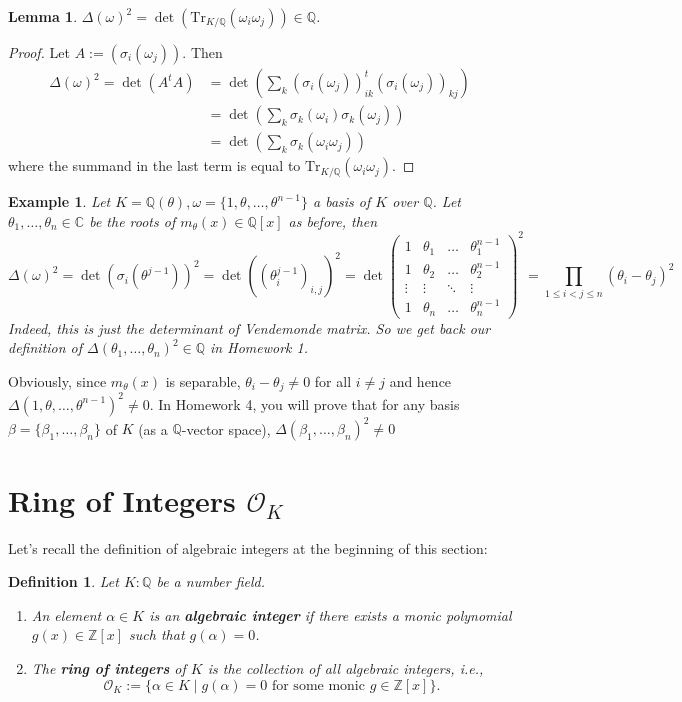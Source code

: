 \documentclass[11pt]{book}
\newtheorem{definition}[theorem]{Definition}
\newtheorem{example}[theorem]{Example}
\newtheorem{lemma}[theorem]{Lemma}
\begin{document}
\begin{lemma} $\Delta(\omega)^2 = \det(\text{Tr}_{K/\mathbb{Q}}(\omega_i\omega_j)) \in \mathbb{Q}$.
\end{lemma}

\begin{proof} Let $A := (\sigma_i(\omega_j))$. Then
\begin{align*}
\Delta(\omega)^2 = \det(A^t A) &= \det\left(\sum_k (\sigma_i(\omega_j))^t_{ik}(\sigma_i(\omega_j))_{kj}\right)
\\ &= \det\left(\sum_k \sigma_k(\omega_i)\sigma_k(\omega_j)\right)\\
&= \det\left(\sum_k \sigma_k(\omega_i\omega_j)\right)
\end{align*}
where the summand in the last term is equal to $\text{Tr}_{K/\mathbb{Q}}(\omega_i\omega_j)$.
\end{proof}

\begin{example} \label{eg-discrim} Let $K = \mathbb{Q}(\theta), \omega = \{1, \theta, \dots, \theta^{n-1}\}$ a basis of $K$ over $\mathbb{Q}$. Let $\theta_1, \dots, \theta_n \in \mathbb{C}$ be the roots of $m_{\theta}(x) \in \mathbb{Q}[x]$ as before, then
\[
\Delta(\omega)^2 = \det(\sigma_i(\theta^{j-1}))^2 = \det((\theta_i^{j-1})_{i,j})^2
= \det\begin{pmatrix}
1 & \theta_1 & \dots & \theta_1^{n-1} \\
1 & \theta_2 & \dots & \theta_2^{n-1} \\
\vdots & \vdots & \ddots & \vdots \\
1 & \theta_n & \dots & \theta_n^{n-1}
\end{pmatrix}^2 = \prod_{1\leq i<j \leq n} (\theta_i - \theta_j)^2
\]
Indeed, this is just the determinant of Vendemonde matrix. So we get back our definition of $\Delta(\theta_1, \dots, \theta_n)^2 \in \mathbb{Q}$ in Homework 1.
\end{example}
Obviously, since $m_{\theta}(x)$ is separable, $\theta_i - \theta_j \neq 0$ for all $i \neq j$ and hence $\Delta(1,\theta,\dots,\theta^{n-1})^2 \neq 0$. In Homework 4, you will prove that for any basis $\beta = \{\beta_1, \dots, \beta_n\}$ of $K$ (as a $\mathbb{Q}$-vector space), $\Delta(\beta_1, \dots, \beta_n)^2 \neq 0$

\section{Ring of Integers $\mathcal{O}_K$}
Let's recall the definition of algebraic integers at the beginning of this section:
\begin{definition}
Let $ K: \mathbb{Q} $ be a number field. 
\begin{enumerate}
    \item[(a)] An element $ \alpha \in K $ is an {\bf algebraic integer} if there exists a monic polynomial $ g(x) \in \mathbb{Z}[x] $ such that $ g(\alpha) = 0 $.
    \item[(b)] The {\bf ring of integers} of $ K $ is the collection of all algebraic integers, i.e.,
$$
\mathcal{O}_K := \{\alpha \in K \mid g(\alpha) = 0 \text{ for some monic } g \in \mathbb{Z}[x]\}.
$$
\end{enumerate}
\end{definition}
\end{document}
